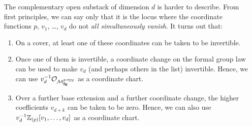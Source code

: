 \begin{remark}
The complementary open substack of dimension $d$ is harder to describe.  From first principles, we can say only that it is the locus where the coordinate functions $p$, $v_1$, \ldots, $v_d$ do not \emph{all simultaneously vanish}.  It turns out that:
\begin{enumerate}
\item On a cover, at least one of these coordinates can be taken to be invertible.
\item Once one of them is invertible, a coordinate change on the formal group law can be used to make $v_d$ (and perhaps others in the list) invertible.  Hence, we can use $v_d^{-1} \mathcal{O}_{\mathcal{M}_{\mathbf{fg}}^{p\text{-}\mathrm{typ}}}$ as a coordinate chart.
\item Over a further base extension and a further coordinate change, the higher coefficients $v_{d+k}$ can be taken to be zero.  Hence, we can also use $v_d^{-1} \mathbb Z_{(p)}[v_1, \ldots, v_d]$ as a coordinate chart.
\end{enumerate}
\end{remark}

